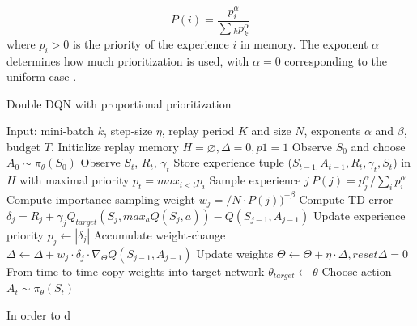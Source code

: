 \documentclass[12pt,a4paper]{article}
\begin{document}
\begin{equation}
    P(i) = \frac{p_i^\alpha}{\sum{_k p_k^\alpha}}
\end{equation}
where $p_i > 0$ is the priority of the experience $i$ in memory. The exponent $\alpha$ determines how much prioritization is used, with $\alpha = 0$ corresponding to the uniform case \cite{Schaul2016}.
\begin{algorithm}
    \label{alg:prioritizedReplay}
    \caption{Double DQN with proportional prioritization \cite{Schaul2016}}
    \begin{algorithmic}
    \State Input: mini-batch $k$, step-size $\eta$, replay period $K$ and size $N$, exponents $\alpha$ and $\beta$, budget $T$.
    \State Initialize replay memory $H = \varnothing, \Delta = 0, p1 = 1$
    \State Observe $S_0$ and choose $A_0 \sim \pi_\theta(S_0)$
        \State Observe $S_t$, $R_t$, $\gamma_t$
        \State Store experience tuple ($S_{t-1,} A_{t-1}, R_t, \gamma_t, S_t$) in $H$ with maximal priority $p_t = max_{i<t}p_i$
                \State Sample experience $j ~ P(j) = p^\alpha_j/\sum_i{p^\alpha_i}$
                \State Compute importance-sampling weight $w_j = / N \cdot P(j))^{-\beta}$
                \State Compute TD-error $\delta_j = R_j + \gamma_jQ_{target}(S_j, max_aQ(S_j,a)) - Q(S_{j-1},A_{j-1})$
                \State Update experience priority $p_j \leftarrow |\delta_j|$
                \State Accumulate weight-change $\Delta \leftarrow \Delta + w_j \cdot \delta_j \cdot \nabla_\Theta Q(S_{j-1}, A_{j-1})$
            \EndFor
            \State Update weights $\Theta \leftarrow \Theta + \eta \cdot \Delta, reset \Delta = 0$
            \State From time to time copy weights into target network $\theta_{target} \leftarrow \theta$
        \EndIf
        \State Choose action $A_t \sim \pi_\theta(S_t)$
    \EndFor
    \end{algorithmic}
\end{algorithm}
In order to d
\end{document}
